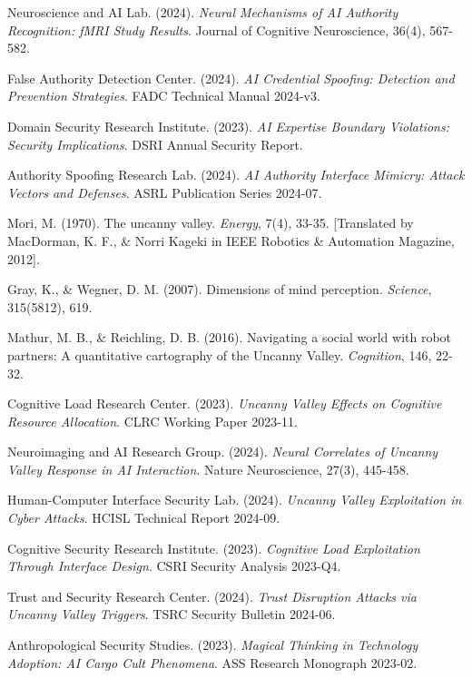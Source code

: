 \documentclass[11pt,a4paper]{article}
\begin{document}
\begin{thebibliography}{99}
Neuroscience and AI Lab. (2024). \textit{Neural Mechanisms of AI Authority Recognition: fMRI Study Results}. Journal of Cognitive Neuroscience, 36(4), 567-582.

False Authority Detection Center. (2024). \textit{AI Credential Spoofing: Detection and Prevention Strategies}. FADC Technical Manual 2024-v3.

Domain Security Research Institute. (2023). \textit{AI Expertise Boundary Violations: Security Implications}. DSRI Annual Security Report.

Authority Spoofing Research Lab. (2024). \textit{AI Authority Interface Mimicry: Attack Vectors and Defenses}. ASRL Publication Series 2024-07.

Mori, M. (1970). The uncanny valley. \textit{Energy}, 7(4), 33-35. [Translated by MacDorman, K. F., \& Norri Kageki in IEEE Robotics \& Automation Magazine, 2012].

Gray, K., \& Wegner, D. M. (2007). Dimensions of mind perception. \textit{Science}, 315(5812), 619.

Mathur, M. B., \& Reichling, D. B. (2016). Navigating a social world with robot partners: A quantitative cartography of the Uncanny Valley. \textit{Cognition}, 146, 22-32.

Cognitive Load Research Center. (2023). \textit{Uncanny Valley Effects on Cognitive Resource Allocation}. CLRC Working Paper 2023-11.

Neuroimaging and AI Research Group. (2024). \textit{Neural Correlates of Uncanny Valley Response in AI Interaction}. Nature Neuroscience, 27(3), 445-458.

Human-Computer Interface Security Lab. (2024). \textit{Uncanny Valley Exploitation in Cyber Attacks}. HCISL Technical Report 2024-09.

Cognitive Security Research Institute. (2023). \textit{Cognitive Load Exploitation Through Interface Design}. CSRI Security Analysis 2023-Q4.

Trust and Security Research Center. (2024). \textit{Trust Disruption Attacks via Uncanny Valley Triggers}. TSRC Security Bulletin 2024-06.

Anthropological Security Studies. (2023). \textit{Magical Thinking in Technology Adoption: AI Cargo Cult Phenomena}. ASS Research Monograph 2023-02.


\end{thebibliography}
\end{document}
